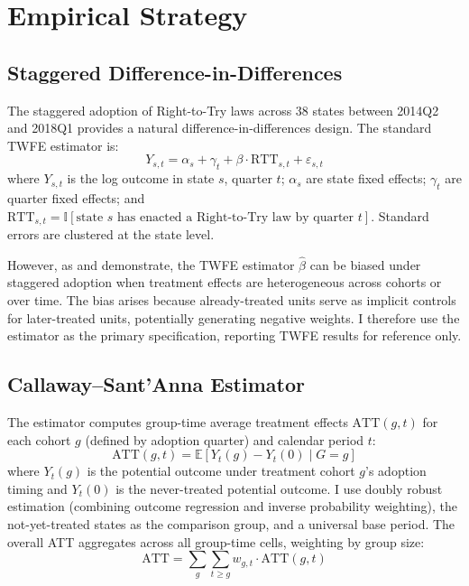 \documentclass[12pt]{article}
\newcommand{\E}{\mathbb{E}}
\newcommand{\ind}{\mathbb{I}}
\begin{document}
\section{Empirical Strategy}\label{sec:strategy}

\subsection{Staggered Difference-in-Differences}

The staggered adoption of Right-to-Try laws across 38 states between 2014Q2 and 2018Q1 provides a natural difference-in-differences design. The standard TWFE estimator is:
\begin{equation}
    Y_{s,t} = \alpha_s + \gamma_t + \beta \cdot \text{RTT}_{s,t} + \varepsilon_{s,t}
    \label{eq:twfe}
\end{equation}
where $Y_{s,t}$ is the log outcome in state $s$, quarter $t$; $\alpha_s$ are state fixed effects; $\gamma_t$ are quarter fixed effects; and $\text{RTT}_{s,t} = \ind[\text{state } s \text{ has enacted a Right-to-Try law by quarter } t]$. Standard errors are clustered at the state level.

However, as \citet{goodman2021difference} and \citet{de2020two} demonstrate, the TWFE estimator $\hat{\beta}$ can be biased under staggered adoption when treatment effects are heterogeneous across cohorts or over time. The bias arises because already-treated units serve as implicit controls for later-treated units, potentially generating negative weights. I therefore use the \citet{callaway2021difference} estimator as the primary specification, reporting TWFE results for reference only.

\subsection{Callaway--Sant'Anna Estimator}

The \citeauthor{callaway2021difference} estimator computes group-time average treatment effects $\text{ATT}(g,t)$ for each cohort $g$ (defined by adoption quarter) and calendar period $t$:
\begin{equation}
    \text{ATT}(g,t) = \E[Y_t(g) - Y_t(0) \mid G = g]
    \label{eq:cs}
\end{equation}
where $Y_t(g)$ is the potential outcome under treatment cohort $g$'s adoption timing and $Y_t(0)$ is the never-treated potential outcome. I use doubly robust estimation (combining outcome regression and inverse probability weighting), the not-yet-treated states as the comparison group, and a universal base period. The overall ATT aggregates across all group-time cells, weighting by group size:
\begin{equation}
    \text{ATT} = \sum_g \sum_{t \geq g} w_{g,t} \cdot \text{ATT}(g,t)
    \label{eq:att_agg}
\end{equation}
\end{document}
